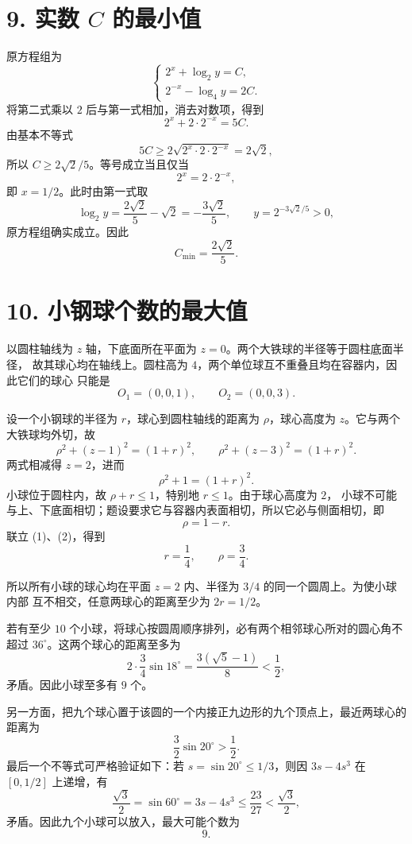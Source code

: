 \documentclass[UTF8,11pt]{ctexart}
\newcommand{\ans}[1]{\boxed{#1}}
\begin{document}
\section*{9. 实数 $C$ 的最小值}

原方程组为
\[
  \begin{cases}
    2^x+\log_2y=C,\\
    2^{-x}-\log_4y=2C.
  \end{cases}
\]
将第二式乘以 $2$ 后与第一式相加，消去对数项，得到
\[
  2^x+2\cdot2^{-x}=5C.
\]
由基本不等式
\[
  5C\geqslant2\sqrt{2^x\cdot2\cdot2^{-x}}=2\sqrt2,
\]
所以 $C\geqslant2\sqrt2/5$。等号成立当且仅当
\[
  2^x=2\cdot2^{-x},
\]
即 $x=1/2$。此时由第一式取
\[
  \log_2y=\frac{2\sqrt2}{5}-\sqrt2=-\frac{3\sqrt2}{5},
  \qquad y=2^{-3\sqrt2/5}>0,
\]
原方程组确实成立。因此
\[
  \ans{C_{\min}=\frac{2\sqrt2}{5}}.
\]

\section*{10. 小钢球个数的最大值}

以圆柱轴线为 $z$ 轴，下底面所在平面为 $z=0$。两个大铁球的半径等于圆柱底面半径，
故其球心均在轴线上。圆柱高为 $4$，两个单位球互不重叠且均在容器内，因此它们的球心
只能是
\[
  O_1=(0,0,1),\qquad O_2=(0,0,3).
\]

设一个小钢球的半径为 $r$，球心到圆柱轴线的距离为 $\rho$，球心高度为 $z$。它与两个
大铁球均外切，故
\[
  \rho^2+(z-1)^2=(1+r)^2,
  \qquad
  \rho^2+(z-3)^2=(1+r)^2.
\]
两式相减得 $z=2$，进而
\[
  \rho^2+1=(1+r)^2. \tag{1}
\]
小球位于圆柱内，故 $\rho+r\leqslant1$，特别地 $r\leqslant1$。由于球心高度为 $2$，
小球不可能与上、下底面相切；题设要求它与容器内表面相切，所以它必与侧面相切，即
\[
  \rho=1-r. \tag{2}
\]
联立 (1)、(2)，得到
\[
  r=\frac14,\qquad \rho=\frac34.
\]

所以所有小球的球心均在平面 $z=2$ 内、半径为 $3/4$ 的同一个圆周上。为使小球内部
互不相交，任意两球心的距离至少为 $2r=1/2$。

若有至少 $10$ 个小球，将球心按圆周顺序排列，必有两个相邻球心所对的圆心角不超过
$36^\circ$。这两个球心的距离至多为
\[
  2\cdot\frac34\sin18^\circ
  =\frac{3(\sqrt5-1)}8<\frac12,
\]
矛盾。因此小球至多有 $9$ 个。

另一方面，把九个球心置于该圆的一个内接正九边形的九个顶点上，最近两球心的距离为
\[
  \frac32\sin20^\circ>\frac12.
\]
最后一个不等式可严格验证如下：若 $s=\sin20^\circ\leqslant1/3$，则因
$3s-4s^3$ 在 $[0,1/2]$ 上递增，有
\[
  \frac{\sqrt3}{2}=\sin60^\circ=3s-4s^3
  \leqslant\frac{23}{27}<\frac{\sqrt3}{2},
\]
矛盾。因此九个小球可以放入，最大可能个数为
\[
  \ans{9}.
\]
\end{document}
